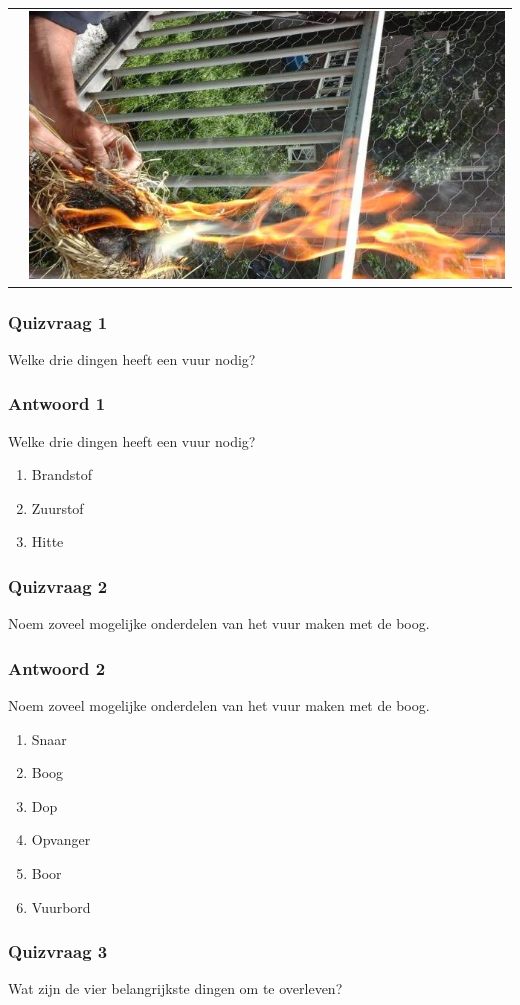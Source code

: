 \documentclass[a4paper, handout]{beamer}
\begin{document}
\begin{frame}
\begin{tabular}{ c c }
		&
		\includegraphics[scale=0.2]{blazen-4}
		\\
	\end{tabular}
\end{frame}

\begin{frame}
	\frametitle{Quizvraag 1}
	Welke drie dingen heeft een vuur nodig?
\end{frame}

\begin{frame}
	\frametitle{Antwoord 1}
	Welke drie dingen heeft een vuur nodig?
	\begin{enumerate}
		\item{Brandstof}
		\item{Zuurstof}
		\item{Hitte}
	\end{enumerate}
\end{frame}
\begin{frame}
	\frametitle{Quizvraag 2}
	Noem zoveel mogelijke onderdelen van het vuur maken met de boog.
\end{frame}

\begin{frame}
	\frametitle{Antwoord 2}
	Noem zoveel mogelijke onderdelen van het vuur maken met de boog.
	\begin{enumerate}
		\item{Snaar}
		\item{Boog}
		\item{Dop}
		\item{Opvanger}
		\item{Boor}
		\item{Vuurbord}
	\end{enumerate}
\end{frame}

\begin{frame}
	\frametitle{Quizvraag 3}
	Wat zijn de vier belangrijkste dingen om te overleven?
\end{frame}
\end{document}
